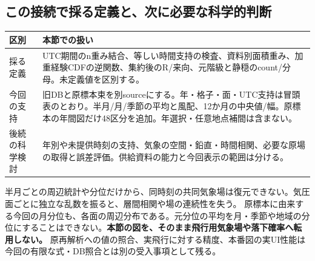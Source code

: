 \documentclass[11pt,a4paper]{article}
\begin{document}
\subsection{この接続で採る定義と、次に必要な科学的判断}
\begin{center}\small
\begin{tabular}{@{}p{27mm}p{131mm}@{}}
\toprule 区別 & 本節での扱い \\\midrule
採る定義 & UTC期間のn重み結合、等しい時間支持の検査、資料別面積重み、加重経験CDFの逆関数、集約後のR/来向、元階級と静穏のcount/分母。未定義値を区別する。\\
今回の支持 & 旧DBと原標本束を別sourceにする。年・格子・面・UTC支持は冒頭表のとおり。半月/月/季節の平均と風配、12か月の中央値/幅。原標本の年間図だけ48区分を追加。年選択・任意地点補間は含まない。\\
後続の科学検討 & 年別や未提供時刻の支持、気象の空間・鉛直・時間相関、必要な原場の取得と誤差評価。供給資料の能力と今回表示の範囲は分ける。\\\bottomrule
\end{tabular}
\end{center}
半月ごとの周辺統計や分位だけから、同時刻の共同気象場は復元できない。気圧面ごとに独立な乱数を振ると、層間相関や場の連続性を失う。
原標本に由来する今回の月分位も、各面の周辺分布である。元分位の平均を月・季節や地域の分位にすることはできない。\textbf{本節の図を、そのまま飛行用気象場や落下確率へ転用しない。}
原再解析への値の照合、実飛行に対する精度、本番図の実UI性能は今回の有限な式・DB照合とは別の受入事項として残る。

\clearpage
\end{document}
